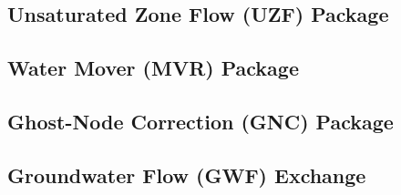 \newpage
\subsection{Unsaturated Zone Flow (UZF) Package}


\newpage
\subsection{Water Mover (MVR) Package}


\newpage
\subsection{Ghost-Node Correction (GNC) Package}


\newpage
\subsection{Groundwater Flow (GWF) Exchange}


